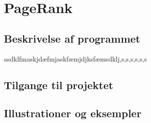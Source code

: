 
\section{PageRank}

\subsection*{Beskrivelse af programmet}
asdklfmaskjdæfmjaskfæmjdjksfæmsdklj,s,s,s,s,s,s

\subsection*{Tilgange til projektet}

\subsection*{Illustrationer og eksempler}
